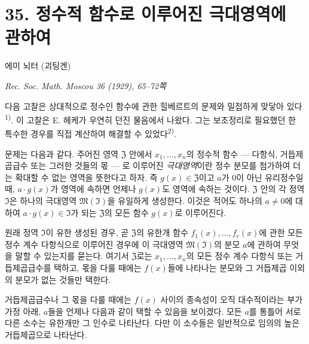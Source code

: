 
\section*{35. 정수적 함수로 이루어진 극대영역에 관하여}

\begin{center}
에미 뇌터 (괴팅겐)\par
\emph{Rec. Soc. Math. Moscou 36 (1929), 65--72쪽}
\end{center}

다음 고찰은 상대적으로 정수인 함수에 관한 힐베르트의 문제와 밀접하게 맞닿아 있다\textsuperscript{1)}. 이 고찰은 E. 헤케가 우연히 던진 물음에서 나왔다. 그는 보조정리로 필요했던 한 특수한 경우를 직접 계산하여 해결할 수 있었다\textsuperscript{2)}.

문제는 다음과 같다. 주어진 영역 \(\mathfrak Z\) 안에서 \(x_1,\ldots,x_n\)의 정수적 함수 --- 다항식, 거듭제곱급수 또는 그러한 것들의 몫 --- 로 이루어진 \emph{극대영역}이란 정수 분모를 첨가하여 더는 확대할 수 없는 영역을 뜻한다고 하자. 즉 \(g(x)\in\mathfrak Z\)이고 \(a\)가 0이 아닌 유리정수일 때, \(a\cdot g(x)\)가 영역에 속하면 언제나 \(g(x)\)도 영역에 속하는 것이다. \(\mathfrak Z\) 안의 각 정역 \(\mathfrak I\)은 하나의 극대영역 \(\mathfrak M(\mathfrak I)\)을 유일하게 생성한다. 이것은 적어도 하나의 \(a\ne0\)에 대하여 \(a\cdot g(x)\in\mathfrak I\)가 되는 \(\mathfrak Z\)의 모든 함수 \(g(x)\)로 이루어진다.

원래 정역 \(\mathfrak I\)이 유한 생성된 경우, 곧 \(\mathfrak Z\)의 유한개 함수 \(f_1(x),\ldots,f_r(x)\)에 관한 모든 정수 계수 다항식으로 이루어진 경우에 이 극대영역 \(\mathfrak M(\mathfrak I)\)의 분모 \(a\)에 관하여 무엇을 말할 수 있는지를 묻는다. 여기서 \(\mathfrak Z\)로는 \(x_1,\ldots,x_n\)의 모든 정수 계수 다항식 또는 거듭제곱급수를 택하고, 몫을 다룰 때에는 \(f(x)\)들에 나타나는 분모와 그 거듭제곱 이외의 분모가 없는 것들만 택한다.

거듭제곱급수나 그 몫을 다룰 때에는 \(f(x)\) 사이의 종속성이 오직 대수적이라는 부가가정 아래, \(a\)들을 언제나 다음과 같이 택할 수 있음을 보이겠다. 모든 \(a\)를 통틀어 서로 다른 소수는 유한개만 그 인수로 나타난다. 다만 이 소수들은 일반적으로 임의의 높은 거듭제곱으로 나타난다.


